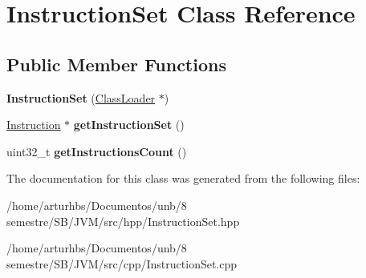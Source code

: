 \hypertarget{classInstructionSet}{}\section{Instruction\+Set Class Reference}
\label{classInstructionSet}
\subsection*{Public Member Functions}
\begin{DoxyCompactItemize}
\item 
{\bfseries Instruction\+Set} (\hyperlink{classClassLoader}{Class\+Loader} $\ast$)\hypertarget{classInstructionSet_a5772a14ed3d8dfe4bf7cde0ab9d0900c}{}\label{classInstructionSet_a5772a14ed3d8dfe4bf7cde0ab9d0900c}

\item 
\hyperlink{classInstruction}{Instruction} $\ast$ {\bfseries get\+Instruction\+Set} ()\hypertarget{classInstructionSet_a8d09c986c407d39234556065bda749c9}{}\label{classInstructionSet_a8d09c986c407d39234556065bda749c9}

\item 
uint32\+\_\+t {\bfseries get\+Instructions\+Count} ()\hypertarget{classInstructionSet_a2480c843d9d96b2a0b52c6a9972d9d5e}{}\label{classInstructionSet_a2480c843d9d96b2a0b52c6a9972d9d5e}

\end{DoxyCompactItemize}


The documentation for this class was generated from the following files\+:\begin{DoxyCompactItemize}
\item 
/home/arturhbs/\+Documentos/unb/8 semestre/\+S\+B/\+J\+V\+M/src/hpp/Instruction\+Set.\+hpp\item 
/home/arturhbs/\+Documentos/unb/8 semestre/\+S\+B/\+J\+V\+M/src/cpp/Instruction\+Set.\+cpp\end{DoxyCompactItemize}
